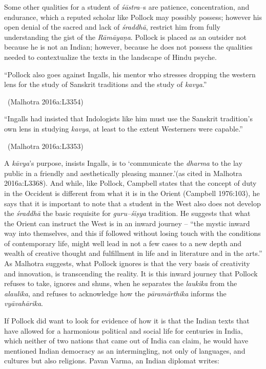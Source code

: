 Some other qualities for a student of \textit{śāstra}–s are patience, concentration, and endurance, which a reputed scholar like Pollock may possibly possess; however his open denial of the sacred and lack of \textit{śraddhā}, restrict him from fully understanding the gist of the \textit{Rāmāyaṇa}. Pollock is placed as an outsider not because he is not an Indian; however, because he does not possess the qualities needed to contextualize the texts in the landscape of Hindu psyche.

\begin{myquote}
“Pollock also goes against Ingalls, his mentor who stresses dropping the western lens for the study of Sanskrit traditions and the study of \textit{kavya}.” 

~\hfill (Malhotra 2016a:L3354)
\end{myquote}

\begin{myquote}
“Ingalls had insisted that Indologists like him must use the Sanskrit tradition’s own lens in studying \textit{kavya}, at least to the extent Westerners were capable.” 

~\hfill (Malhotra 2016a:L3353)
\end{myquote}

A \textit{kāvya}’s purpose, insists Ingalls, is to ‘communicate the \textit{dharma} to the lay public in a friendly and aesthetically pleasing manner.’(as cited in Malhotra 2016a:L3368). And while, like Pollock, Campbell states that the concept of duty in the Occident is different from what it is in the Orient (Campbell 1976:103), he says that it is important to note that a student in the West also does not develop the \textit{śraddhā} the basic requisite for \textit{guru–śiṣya} tradition. He suggests that what the Orient can instruct the West is in an inward journey – “the mystic inward way into themselves, and this if followed without losing touch with the conditions of contemporary life, might well lead in not a few cases to a new depth and wealth of creative thought and fulfillment in life and in literature and in the arts.” As Malhotra suggests, what Pollock ignores is that the very basis of creativity and innovation, is transcending the reality. It is this inward journey that Pollock refuses to take, ignores and shuns, when he separates the \textit{laukika} from the \textit{alaulika}, and refuses to acknowledge how the \textit{pāramārthika} informs the \textit{vyāvahārika}.

If Pollock did want to look for evidence of how it is that the Indian texts that have allowed for a harmonious political and social life for centuries in India, which neither of two nations that came out of India can claim, he would have mentioned Indian democracy as an intermingling, not only of languages, and cultures but also religions. Pavan Varma, an Indian diplomat writes:

